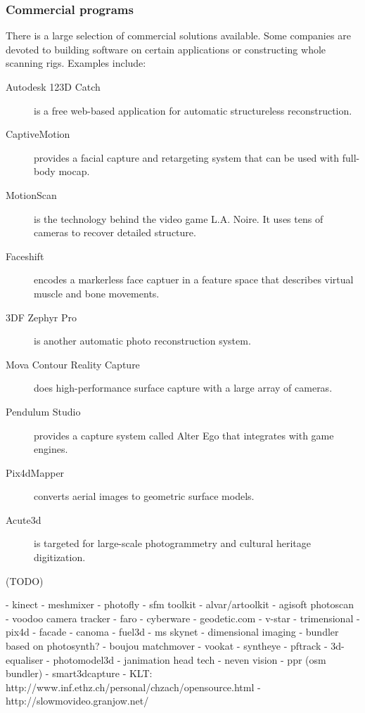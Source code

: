 

\subsubsection{Commercial programs} %

There is a large selection of commercial solutions available. Some companies are devoted to building software on certain applications or constructing whole scanning rigs. Examples include:
\begin{description}
\item[Autodesk 123D Catch] is a free web-based application for automatic structureless reconstruction.
\item[CaptiveMotion] provides a facial capture and retargeting system that can be used with full-body mocap.
\item[MotionScan] is the technology behind the video game L.A. Noire. \cite{rockstar2011noire} It uses tens of cameras to recover detailed structure.
\item[Faceshift] encodes a markerless face captuer in a feature space that describes virtual muscle and bone movements.
\item[3DF Zephyr Pro] is another automatic photo reconstruction system.
\item[Mova Contour Reality Capture] does high-performance surface capture with a large array of cameras.
\item[Pendulum Studio] provides a capture system called Alter Ego that integrates with game engines.
\item[Pix4dMapper] converts aerial images to geometric surface models.
\item[Acute3d] is targeted for large-scale photogrammetry and cultural heritage digitization.
\end{description}



(TODO)

- kinect
- meshmixer
- photofly
- sfm toolkit
- alvar/artoolkit
- agisoft photoscan
- voodoo camera tracker
- faro
- cyberware
- geodetic.com
- v-star
- trimensional
- pix4d
- facade
- canoma
- fuel3d
- ms skynet
- dimensional imaging
- bundler based on photosynth?
- boujou matchmover
- vookat
- syntheye
- pftrack
- 3d-equaliser
- photomodel3d
- janimation head tech
- neven vision
- ppr (osm bundler)
- smart3dcapture
- KLT: http://www.inf.ethz.ch/personal/chzach/opensource.html
- http://slowmovideo.granjow.net/

